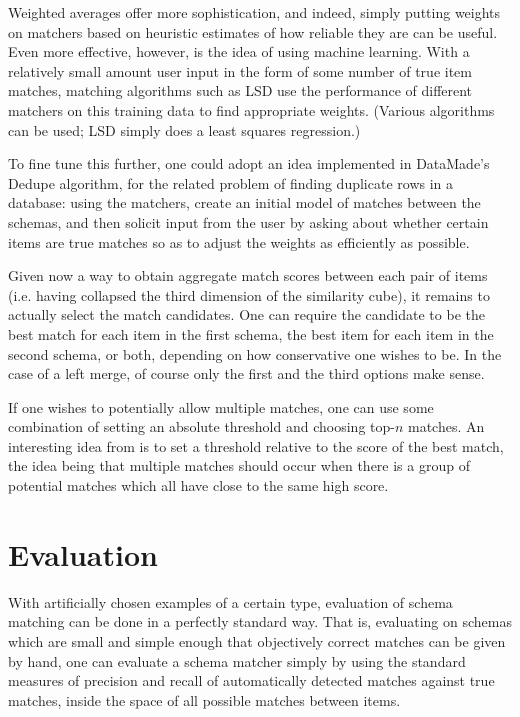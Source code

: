 \documentclass{datamade}
\theoremstyle{definition}
\theoremstyle{remark}
\begin{document}
Weighted averages offer more sophistication, and indeed, simply putting weights on matchers based on heuristic estimates of how reliable they are can be useful. Even more effective, however, is the idea of using machine learning. With a relatively small amount user input in the form of some number of true item matches, matching algorithms such as LSD \cite{machine} use the performance of different matchers on this training data to find appropriate weights. (Various algorithms can be used; LSD simply does a least squares regression.) 

To fine tune this further, one could adopt an idea implemented in DataMade's Dedupe algorithm, for the related problem of finding duplicate rows in a database: using the matchers, create an initial model of matches between the schemas, and then solicit input from the user by asking about whether certain items are true matches so as to adjust the weights as efficiently as possible.

Given now a way to obtain aggregate match scores between each pair of items (i.e. having collapsed the third dimension of the similarity cube), it remains to actually select the match candidates. One can require the candidate to be the best match for each item in the first schema, the best item for each item in the second schema, or both, depending on how conservative one wishes to be. In the case of a left merge, of course only the first and the third options make sense.

If one wishes to potentially allow multiple matches, one can use some combination of setting an absolute threshold and choosing top-$n$ matches. An interesting idea from \cite{coma} is to set a threshold relative to the score of the best match, the idea being that multiple matches should occur when there is a group of potential matches which all have close to the same high score.

\section{Evaluation}

With artificially chosen examples of a certain type, evaluation of schema matching can be done in a perfectly standard way. That is, evaluating on schemas which are small and simple enough that objectively correct matches can be given by hand, one can evaluate a schema matcher simply by using the standard measures of precision and recall of automatically detected matches against true matches, inside the space of all possible matches between items.
\end{document}
